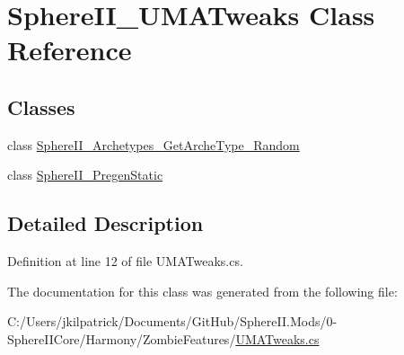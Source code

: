 \hypertarget{class_sphere_i_i___u_m_a_tweaks}{}\section{Sphere\+I\+I\+\_\+\+U\+M\+A\+Tweaks Class Reference}
\label{class_sphere_i_i___u_m_a_tweaks}
\subsection*{Classes}
\begin{DoxyCompactItemize}
\item 
class \mbox{\hyperlink{class_sphere_i_i___u_m_a_tweaks_1_1_sphere_i_i___archetypes___get_arche_type___random}{Sphere\+I\+I\+\_\+\+Archetypes\+\_\+\+Get\+Arche\+Type\+\_\+\+Random}}
\item 
class \mbox{\hyperlink{class_sphere_i_i___u_m_a_tweaks_1_1_sphere_i_i___pregen_static}{Sphere\+I\+I\+\_\+\+Pregen\+Static}}
\end{DoxyCompactItemize}


\subsection{Detailed Description}


Definition at line 12 of file U\+M\+A\+Tweaks.\+cs.



The documentation for this class was generated from the following file\+:\begin{DoxyCompactItemize}
\item 
C\+:/\+Users/jkilpatrick/\+Documents/\+Git\+Hub/\+Sphere\+I\+I.\+Mods/0-\/\+Sphere\+I\+I\+Core/\+Harmony/\+Zombie\+Features/\mbox{\hyperlink{_u_m_a_tweaks_8cs}{U\+M\+A\+Tweaks.\+cs}}\end{DoxyCompactItemize}
